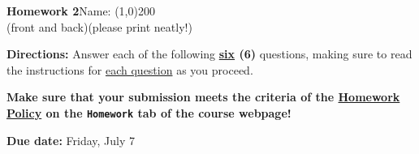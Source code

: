 \documentclass[12pt]{article}
\begin{document}
	\begin{flushright}
		{\large \textbf{Homework 2}}\hfill Name: \line(1,0){200}\\
		{\mbox{\hspace{1.75mm}}\small(front and back)}\hfill{\small (please print neatly!)}\mbox{\hspace{0.7in}}
	\end{flushright}
	\vspace{-1.5mm}
	\begin{adjustwidth}{0.5in}{0.5in}
		\begin{tcolorbox}[
			arc=0pt, colback=white, colframe=black, boxrule=0.5pt, before upper={\parindent15pt \parskip=3mm}]
			
			{\noindent\textbf{Directions:} Answer each of the following \textbf{\ul{six} (6)} questions, making sure to read the instructions for \ul{each question} as you proceed. \par
			
			\textbf{Make sure that your submission meets the criteria of the \ul{Homework Policy} on the \texttt{Homework} tab of the course webpage!}
				
			\hfill\textbf{Due date:} Friday, July 7}
		\end{tcolorbox}
	\end{adjustwidth}
		
\end{document}
